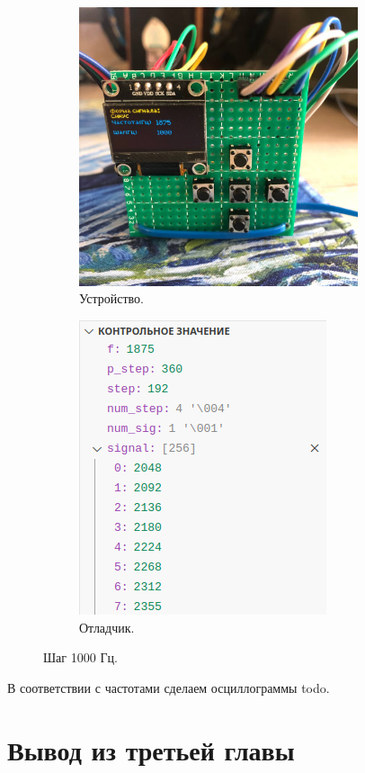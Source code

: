 	\begin{figure}[H]
     \begin{subfigure}[H]{0.5\textwidth}
         \centering
         \includegraphics[width=0.9\textwidth]{../image/test4_u_f.jpg}
         \caption{Устройство.}
     \end{subfigure}
     \hfill
     \begin{subfigure}[H]{0.5\textwidth}
         \centering
         \includegraphics[width=0.8\textwidth]{../image/test4_o_f.png}
         \caption{Отладчик.}
     \end{subfigure}
        \caption{Шаг 1000 Гц.}
	\end{figure}
	
	В соответствии с частотами сделаем осциллограммы todo.
	
\section{Вывод из третьей главы}

